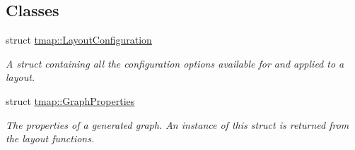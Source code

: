 \subsection*{Classes}
\begin{DoxyCompactItemize}
\item 
struct \hyperlink{structtmap_1_1LayoutConfiguration}{tmap\+::\+Layout\+Configuration}
\begin{DoxyCompactList}\small\item\em A struct containing all the configuration options available for and applied to a layout. \end{DoxyCompactList}\item 
struct \hyperlink{structtmap_1_1GraphProperties}{tmap\+::\+Graph\+Properties}
\begin{DoxyCompactList}\small\item\em The properties of a generated graph. An instance of this struct is returned from the layout functions. \end{DoxyCompactList}\end{DoxyCompactItemize}
